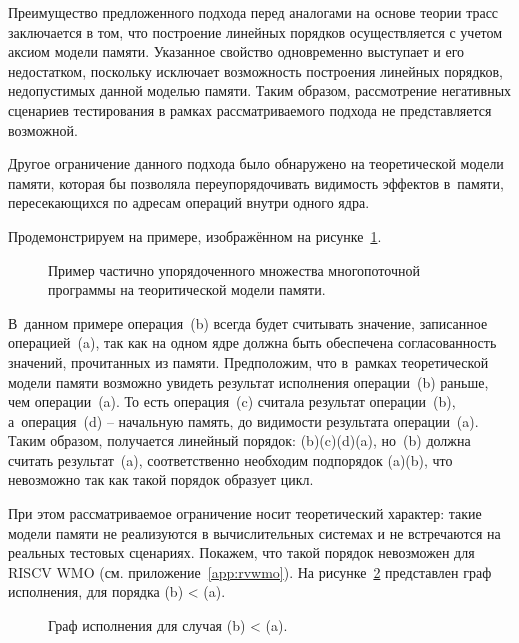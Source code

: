 Преимущество предложенного подхода перед аналогами на основе теории
трасс заключается в том, что построение линейных порядков
осуществляется с учетом аксиом модели памяти.
Указанное свойство одновременно выступает и его недостатком,
поскольку исключает возможность построения линейных порядков,
недопустимых данной моделью памяти.
Таким образом, рассмотрение негативных сценариев тестирования в
рамках рассматриваемого подхода не представляется возможной.

Другое ограничение данного подхода было обнаружено на теоретической
модели памяти, которая бы позволяла переупорядочивать видимость
эффектов в~памяти, пересекающихся по адресам операций внутри одного ядра.

Продемонстрируем на примере, изображённом на рисунке~\ref{fig:impossible-mm}.

\begin{figure}[htbp]
  \centerfloat{
    
  }
  \caption{Пример частично упорядоченного множества многопоточной
  программы на теоритической модели памяти.}
  \label{fig:impossible-mm}
\end{figure}

В~данном примере операция~(b) всегда будет считывать значение,
записанное операцией~(a), так как на одном ядре должна быть
обеспечена согласованность значений, прочитанных из памяти.
Предположим, что в~рамках теоретической модели памяти возможно
увидеть результат исполнения операции~(b) раньше, чем операции~(a).
То есть операция~(c) считала результат операции~(b), а~операция~(d)
-- начальную память, до видимости результата операции~(a).
Таким образом, получается линейный порядок: (b)(c)(d)(a), но~(b)
должна считать результат~(a), соответственно необходим подпорядок
(a)(b), что невозможно так как такой порядок образует цикл.

При этом рассматриваемое ограничение носит теоретический характер:
такие модели памяти не реализуются в вычислительных системах
и не встречаются на реальных тестовых сценариях.
Покажем, что такой порядок невозможен для RISCV WMO (см.
приложение~\ref{app:rvwmo}).
На рисунке~\ref{fig:impossible-exec-graph} представлен граф
исполнения, для порядка (b) < (a).
\begin{figure}[htbp]
  \centerfloat{
    
  }
  \caption{Граф исполнения для случая (b) < (a).}
  \label{fig:impossible-exec-graph}
\end{figure}

